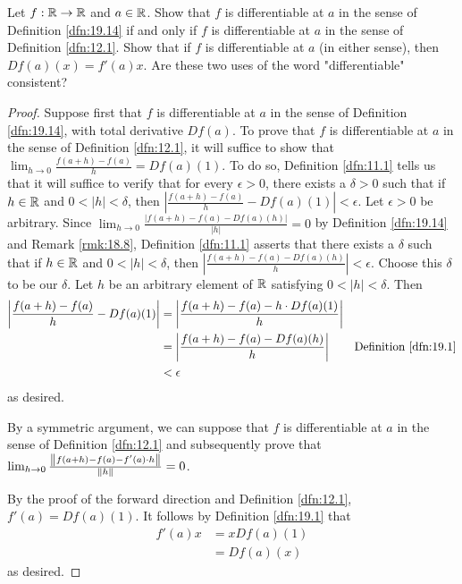 \documentclass[../main.tex]{subfiles}
\begin{document}
\begin{exercise}\label{exr:19.18}
    Let $f:\mathbb{R}\to\mathbb{R}$ and $a\in\mathbb{R}$. Show that $f$ is differentiable at $a$ in the sense of Definition \ref{dfn:19.14} if and only if $f$ is differentiable at $a$ in the sense of Definition \ref{dfn:12.1}. Show that if $f$ is differentiable at $a$ (in either sense), then $Df(a)(x)=f'(a)x$. Are these two uses of the word "differentiable" consistent?
    \begin{proof}
        Suppose first that $f$ is differentiable at $a$ in the sense of Definition \ref{dfn:19.14}, with total derivative $Df(a)$. To prove that $f$ is differentiable at $a$ in the sense of Definition \ref{dfn:12.1}, it will suffice to show that $\lim_{h\to 0}\frac{f(a+h)-f(a)}{h}=Df(a)(1)$. To do so, Definition \ref{dfn:11.1} tells us that it will suffice to verify that for every $\epsilon>0$, there exists a $\delta>0$ such that if $h\in\mathbb{R}$ and $0<|h|<\delta$, then $|\frac{f(a+h)-f(a)}{h}-Df(a)(1)|<\epsilon$. Let $\epsilon>0$ be arbitrary. Since $\lim_{h\to 0}\frac{|f(a+h)-f(a)-Df(a)(h)|}{|h|}=0$ by Definition \ref{dfn:19.14} and Remark \ref{rmk:18.8}, Definition \ref{dfn:11.1} asserts that there exists a $\delta$ such that if $h\in\mathbb{R}$ and $0<|h|<\delta$, then $|\frac{f(a+h)-f(a)-Df(a)(h)}{h}|<\epsilon$. Choose this $\delta$ to be our $\delta$. Let $h$ be an arbitrary element of $\mathbb{R}$ satisfying $0<|h|<\delta$. Then
        \begin{align*}
            \left| \frac{f(a+h)-f(a)}{h}-Df(a)(1) \right| &= \left| \frac{f(a+h)-f(a)-h\cdot Df(a)(1)}{h} \right|\\
            &= \left| \frac{f(a+h)-f(a)-Df(a)(h)}{h} \right|\tag*{Definition \ref{dfn:19.1}}\\
            &< \epsilon
        \end{align*}
        as desired.\par
        By a symmetric argument, we can suppose that $f$ is differentiable at $a$ in the sense of Definition \ref{dfn:12.1} and subsequently prove that $\lim_{h\to 0}\frac{\norm{f(a+h)-f(a)-f'(a)\cdot h}}{\norm{h}}=0$.\par
        By the proof of the forward direction and Definition \ref{dfn:12.1}, $f'(a)=Df(a)(1)$. It follows by Definition \ref{dfn:19.1} that
        \begin{align*}
            f'(a)x &= xDf(a)(1)\\
            &= Df(a)(x)
        \end{align*}
        as desired.
    \end{proof}
\end{exercise}
\end{document}
